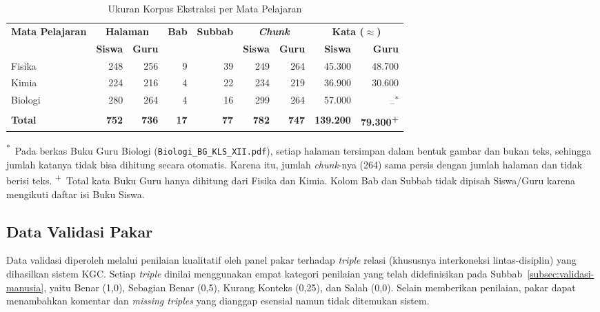 \documentclass[../../thesis]{subfiles}
\begin{document}
\begin{table}[htbp]
\centering
\caption{Ukuran Korpus Ekstraksi per Mata Pelajaran}
\label{tab:ukuran-korpus}
\small
\setlength{\tabcolsep}{5pt}
\begin{tabular}{@{}lrrrrrrrr@{}}
  \toprule
  \multirow{2}{*}{\textbf{Mata Pelajaran}}
    & \multicolumn{2}{c}{\textbf{Halaman}}
    & \multirow{2}{*}{\textbf{Bab}} & \multirow{2}{*}{\textbf{Subbab}}
    & \multicolumn{2}{c}{\textbf{\textit{Chunk}}}
    & \multicolumn{2}{c}{\textbf{Kata ($\approx$)}} \\
  \cmidrule(lr){2-3} \cmidrule(lr){6-7} \cmidrule(lr){8-9}
    & \textbf{Siswa} & \textbf{Guru} & & & \textbf{Siswa} & \textbf{Guru}
    & \textbf{Siswa} & \textbf{Guru} \\
  \midrule
  Fisika  & 248 & 256 & 9 & 39 & 249 & 264 & 45.300 & 48.700 \\
  Kimia   & 224 & 216 & 4 & 22 & 234 & 219 & 36.900 & 30.600 \\
  Biologi & 280 & 264 & 4 & 16 & 299 & 264 & 57.000 & --\textsuperscript{*} \\
  \midrule
  \textbf{Total} & \textbf{752} & \textbf{736} & \textbf{17} & \textbf{77}
    & \textbf{782} & \textbf{747} & \textbf{139.200} & \textbf{79.300\textsuperscript{+}} \\
  \bottomrule
\end{tabular}

\vspace{4pt}
\begin{minipage}{\textwidth}
{\footnotesize{}\noindent
\textsuperscript{*}~Pada berkas Buku Guru Biologi
(\texttt{Biologi\_BG\_KLS\_XII.pdf}), setiap halaman tersimpan dalam bentuk
gambar dan bukan teks, sehingga jumlah katanya tidak bisa dihitung secara
otomatis. Karena itu, jumlah \textit{chunk}-nya (264) sama persis dengan jumlah
halaman dan tidak berisi teks.
\textsuperscript{+}~Total kata Buku Guru hanya dihitung dari Fisika dan Kimia.
Kolom Bab dan Subbab tidak dipisah Siswa/Guru karena mengikuti daftar isi Buku
Siswa.\par}
\end{minipage}
\end{table}

\subsection{Data Validasi Pakar}\label{subsec:data-validasi}

Data validasi diperoleh melalui penilaian kualitatif oleh panel pakar
terhadap \textit{triple} relasi (khususnya interkoneksi
lintas-disiplin) yang dihasilkan sistem KGC. Setiap \textit{triple}
dinilai menggunakan empat kategori penilaian yang telah didefinisikan pada
Subbab~\ref{subsec:validasi-manusia}, yaitu Benar (1,0), Sebagian Benar (0,5), Kurang Konteks
(0,25), dan Salah (0,0). Selain memberikan penilaian, pakar dapat
menambahkan komentar dan \textit{missing triples} yang dianggap esensial
namun tidak ditemukan sistem.
\end{document}

